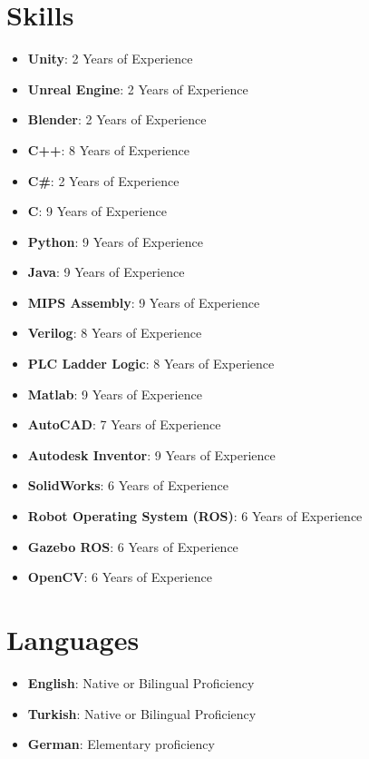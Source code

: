 \documentclass[letterpaper,11pt]{article}
\newcommand{\resumeSkillSimple}[1]{
  \item \small{#1}
}
\newcommand{\resumeSkillExperience}[2]{
  \item \small{\textbf{#1}: #2} \vspace{-10pt}
}
\newcommand{\resumeLanguage}[2]{
  \item
    \textbf{#1}: #2 \vspace{-10pt}
}
\newcommand{\resumeSubHeadingListStart}{\begin{itemize}[leftmargin=0.0in, label={}]}
\newcommand{\resumeSubHeadingListEnd}{\end{itemize}}
\begin{document}

\section{Skills}
\begin{itemize}[leftmargin=0.15in, label={}]
  \resumeSkillExperience{Unity}{2 Years of Experience}
  \resumeSkillExperience{Unreal Engine}{2 Years of Experience}
  \resumeSkillExperience{Blender}{2 Years of Experience}
  \resumeSkillExperience{C++}{8 Years of Experience}
  \resumeSkillExperience{C\#}{2 Years of Experience}
  \resumeSkillExperience{C}{9 Years of Experience}
  \resumeSkillExperience{Python}{9 Years of Experience}
  \resumeSkillExperience{Java}{9 Years of Experience}
  \resumeSkillExperience{MIPS Assembly}{9 Years of Experience}
  \resumeSkillExperience{Verilog}{8 Years of Experience}
  \resumeSkillExperience{PLC Ladder Logic}{8 Years of Experience}
  \resumeSkillExperience{Matlab}{9 Years of Experience}
  \resumeSkillExperience{AutoCAD}{7 Years of Experience}
  \resumeSkillExperience{Autodesk Inventor}{9 Years of Experience}
  \resumeSkillExperience{SolidWorks}{6 Years of Experience}
  \resumeSkillExperience{Robot Operating System (ROS)}{6 Years of Experience}
  \resumeSkillExperience{Gazebo ROS}{6 Years of Experience}
  \resumeSkillExperience{OpenCV}{6 Years of Experience}
\end{itemize}
\vspace{-10pt}

\section{Languages}
  \resumeSubHeadingListStart
    \resumeLanguage
      {English}{Native or Bilingual Proficiency}
    \resumeLanguage
      {Turkish}{Native or Bilingual Proficiency}
    \resumeLanguage
      {German}{Elementary proficiency}
  \resumeSubHeadingListEnd
\vspace{-10pt}
\end{document}
